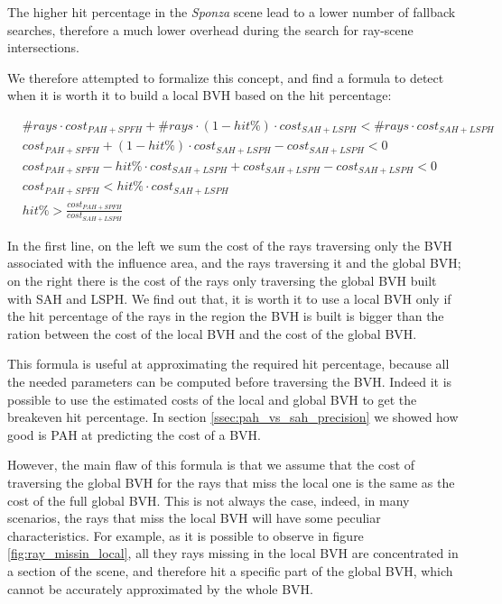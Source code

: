 \documentclass{PoliMi_MasterThesis}
\begin{document}
The higher hit percentage in the \textit{Sponza} scene lead to a lower number of fallback searches, therefore a much lower overhead during the search for ray-scene intersections.

We therefore attempted to formalize this concept, and find a formula to detect when it is worth it to build a local BVH based on the hit percentage:

\begin{subequations}
	\begin{align*}
		&\#rays \cdot cost_{PAH+SPFH} + \#rays \cdot (1-hit\%) \cdot cost_{SAH+LSPH} < \#rays \cdot cost_{SAH+LSPH}\\
		&cost_{PAH+SPFH} + (1-hit\%) \cdot cost_{SAH+LSPH} - cost_{SAH+LSPH} < 0\\
		&cost_{PAH+SPFH} - hit\% \cdot cost_{SAH+LSPH} + cost_{SAH+LSPH} - cost_{SAH+LSPH} < 0\\
		&cost_{PAH+SPFH} < hit\% \cdot cost_{SAH+LSPH}\\
		&hit\% > \frac{cost_{PAH+SPFH}}{cost_{SAH+LSPH}}
	\end{align*}
\end{subequations}

In the first line, on the left we sum the cost of the rays traversing only the BVH associated with the influence area, and the rays traversing it and the global BVH; on the right there is the cost of the rays only traversing the global BVH built with SAH and LSPH. We find out that, it is worth it to use a local BVH only if the hit percentage of the rays in the region the BVH is built is bigger than the ration between the cost of the local BVH and the cost of the global BVH.

This formula is useful at approximating the required hit percentage, because all the needed parameters can be computed before traversing the BVH. Indeed it is possible to use the estimated costs of the local and global BVH to get the breakeven hit percentage. In section \ref{ssec:pah_vs_sah_precision} we showed how good is PAH at predicting the cost of a BVH.

However, the main flaw of this formula is that we assume that the cost of traversing the global BVH for the rays that miss the local one is the same as the cost of the full global BVH. This is not always the case, indeed, in many scenarios, the rays that miss the local BVH will have some peculiar characteristics. For example, as it is possible to observe in figure \ref{fig:ray_missin_local}, all they rays missing in the local BVH are concentrated in a section of the scene, and therefore hit a specific part of the global BVH, which cannot be accurately approximated by the whole BVH.
\end{document}
